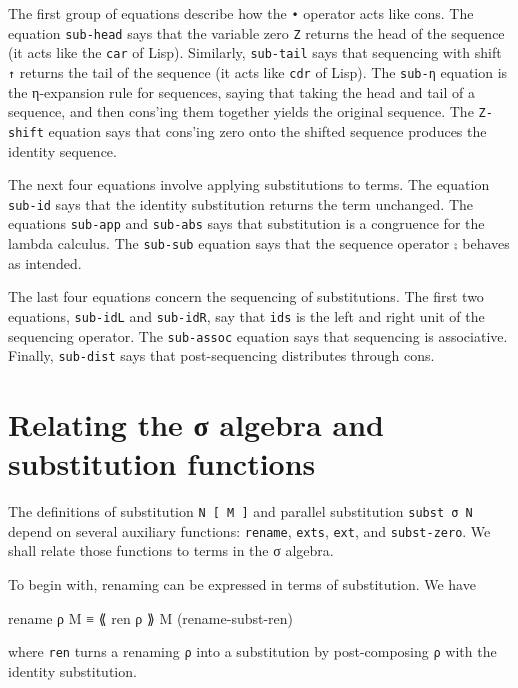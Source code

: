 The first group of equations describe how the \texttt{•} operator acts
like cons. The equation \texttt{sub-head} says that the variable zero
\texttt{Z} returns the head of the sequence (it acts like the
\texttt{car} of Lisp). Similarly, \texttt{sub-tail} says that sequencing
with shift \texttt{↑} returns the tail of the sequence (it acts like
\texttt{cdr} of Lisp). The \texttt{sub-η} equation is the η-expansion
rule for sequences, saying that taking the head and tail of a sequence,
and then cons'ing them together yields the original sequence. The
\texttt{Z-shift} equation says that cons'ing zero onto the shifted
sequence produces the identity sequence.

The next four equations involve applying substitutions to terms. The
equation \texttt{sub-id} says that the identity substitution returns the
term unchanged. The equations \texttt{sub-app} and \texttt{sub-abs} says
that substitution is a congruence for the lambda calculus. The
\texttt{sub-sub} equation says that the sequence operator \texttt{⨟}
behaves as intended.

The last four equations concern the sequencing of substitutions. The
first two equations, \texttt{sub-idL} and \texttt{sub-idR}, say that
\texttt{ids} is the left and right unit of the sequencing operator. The
\texttt{sub-assoc} equation says that sequencing is associative.
Finally, \texttt{sub-dist} says that post-sequencing distributes through
cons.

\hypertarget{relating-the-ux3c3-algebra-and-substitution-functions}{%
\section{Relating the σ algebra and substitution
functions}\label{relating-the-ux3c3-algebra-and-substitution-functions}}

The definitions of substitution \texttt{N\ {[}\ M\ {]}} and parallel
substitution \texttt{subst\ σ\ N} depend on several auxiliary functions:
\texttt{rename}, \texttt{exts}, \texttt{ext}, and \texttt{subst-zero}.
We shall relate those functions to terms in the σ algebra.

To begin with, renaming can be expressed in terms of substitution. We
have

\begin{myDisplay}
rename ρ M ≡ ⟪ ren ρ ⟫ M               (rename-subst-ren)
\end{myDisplay}

where \texttt{ren} turns a renaming \texttt{ρ} into a substitution by
post-composing \texttt{ρ} with the identity substitution.

